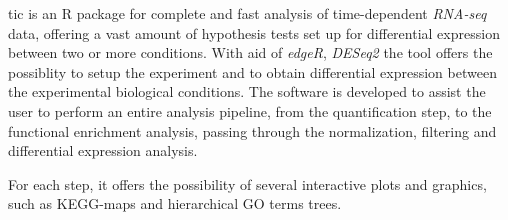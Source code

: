 \gls{tic} is an R package for complete and fast analysis of time-dependent \textit{RNA-seq} data, offering a vast amount of hypothesis tests set up for differential expression between two or more conditions.
With aid of \textit{edgeR}, \textit{DESeq2} 
the tool offers the possiblity to setup the experiment and to obtain differential expression between the experimental biological conditions.
The software is developed to assist the user to perform an entire analysis pipeline, from the quantification step, to the functional enrichment analysis, passing through the normalization, filtering and differential expression analysis.

For each step, it offers the possibility of several interactive plots and graphics, such as KEGG-maps and hierarchical GO terms trees.